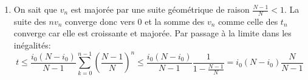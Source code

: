 \begin{enumerate}
\begin{enumerate}
  \item On sait que $v_n$ est majorée par une suite géométrique de raison $\frac{N-1}{N}<1$. La suite des $nv_n$ converge donc vers $0$ et la somme des $v_n$ comme celle des $t_n$ converge car elle est croissante et majorée. Par passage à la limite dans les inégalités:
\begin{displaymath}
  t\leq \frac{i_0 (N-i_0)}{N-1}\sum_{k=0}^{n-1}\left( \frac{N-1}{N}\right)  ^{n}
\leq \frac{i_0 (N-i_0)}{N-1} \frac{1}{1-\frac{N-1}{N}} = i_0 (N-i_0)\frac{N}{N-1}
\end{displaymath}

\end{enumerate}

\end{enumerate}
